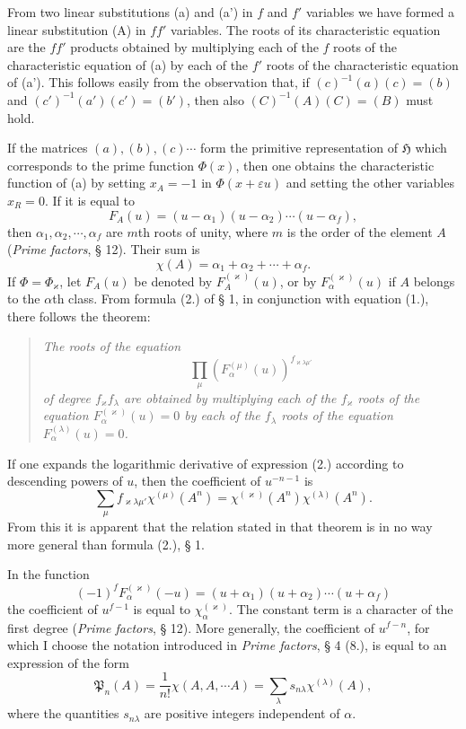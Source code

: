 \documentclass[11pt]{article}
\newcommand{\Hgr}{\mathfrak{H}}
\newcommand{\FrobP}{\mathfrak{P}}
\begin{document}
From two linear substitutions (a) and (a') in $f$ and $f'$ variables we have formed a linear substitution (A) in $ff'$ variables. The roots of its characteristic equation are the $ff'$ products obtained by multiplying each of the $f$ roots of the characteristic equation of (a) by each of the $f'$ roots of the characteristic equation of (a'). This follows easily from the observation that, if $(c)^{-1}(a)(c)=(b)$ and $(c')^{-1}(a')(c')=(b')$, then also $(C)^{-1}(A)(C)=(B)$ must hold.

If the matrices $(a),(b),(c)\cdots$ form the primitive representation of $\Hgr$ which corresponds to the prime function $\Phi(x)$, then one obtains the characteristic function of (a) by setting $x_A=-1$ in $\Phi(x+\varepsilon u)$ and setting the other variables $x_R=0$. If it is equal to
\[
F_A(u)=(u-\alpha_1)(u-\alpha_2)\cdots(u-\alpha_f),
\]
then $\alpha_1,\alpha_2,\cdots,\alpha_f$ are $m$th roots of unity, where $m$ is the order of the element $A$ (\emph{Prime factors}, § 12). Their sum is
\begin{equation*}\tag{1.}
\chi(A)=\alpha_1+\alpha_2+\cdots+\alpha_f.
\end{equation*}
If $\Phi=\Phi_\varkappa$, let $F_A(u)$ be denoted by $F_A^{(\varkappa)}(u)$, or by $F_\alpha^{(\varkappa)}(u)$ if $A$ belongs to the $\alpha$th class. From formula (2.) of § 1, in conjunction with equation (1.), there follows the theorem:
\begin{quote}\itshape
The roots of the equation
\begin{equation*}\tag{2.}
\prod_\mu\left(F_\alpha^{(\mu)}(u)\right)^{f_{\varkappa\lambda\mu'}}
\end{equation*}
of degree $f_\varkappa f_\lambda$ are obtained by multiplying each of the $f_\varkappa$ roots of the equation $F_\alpha^{(\varkappa)}(u)=0$ by each of the $f_\lambda$ roots of the equation $F_\alpha^{(\lambda)}(u)=0$.
\end{quote}
If one expands the logarithmic derivative of expression (2.) according to descending powers of $u$, then the coefficient of $u^{-n-1}$ is
\[
\sum_\mu f_{\varkappa\lambda\mu'}\chi^{(\mu)}(A^n)
=\chi^{(\varkappa)}(A^n)\chi^{(\lambda)}(A^n).
\]
From this it is apparent that the relation stated in that theorem is in no way more general than formula (2.), § 1.

In the function
\begin{equation*}\tag{3.}
(-1)^f F_\alpha^{(\varkappa)}(-u)
=(u+\alpha_1)(u+\alpha_2)\cdots(u+\alpha_f)
\end{equation*}
the coefficient of $u^{f-1}$ is equal to $\chi_\alpha^{(\varkappa)}$. The constant term is a character of the first degree (\emph{Prime factors}, § 12). More generally, the coefficient of $u^{f-n}$, for which I choose the notation introduced in \emph{Prime factors}, § 4 (8.), is equal to an expression of the form
\begin{equation*}\tag{4.}
\FrobP_n(A)=\frac{1}{n!}\chi(A,A,\cdots A)=\sum_\lambda s_{n\lambda}\chi^{(\lambda)}(A),
\end{equation*}
where the quantities $s_{n\lambda}$ are positive integers independent of $\alpha$.
\end{document}
